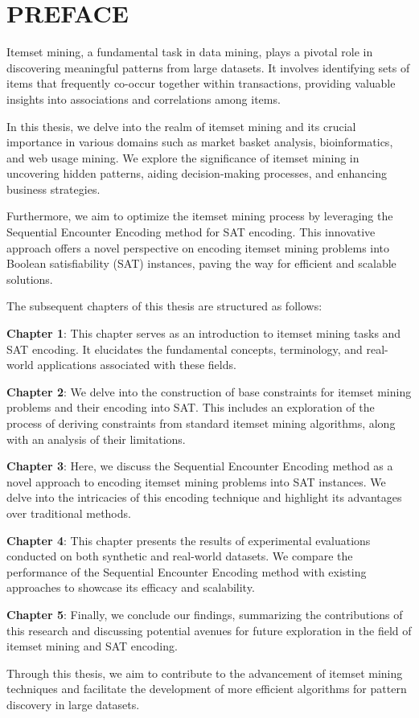 \chapter*{PREFACE}
\fontsize{13}{15}\selectfont

Itemset mining, a fundamental task in data mining, plays a pivotal role in discovering meaningful patterns from large datasets. It involves identifying sets of items that frequently co-occur together within transactions, providing valuable insights into associations and correlations among items.

In this thesis, we delve into the realm of itemset mining and its crucial importance in various domains such as market basket analysis, bioinformatics, and web usage mining. We explore the significance of itemset mining in uncovering hidden patterns, aiding decision-making processes, and enhancing business strategies.

Furthermore, we aim to optimize the itemset mining process by leveraging the Sequential Encounter Encoding method for SAT encoding. This innovative approach offers a novel perspective on encoding itemset mining problems into Boolean satisfiability (SAT) instances, paving the way for efficient and scalable solutions.

The subsequent chapters of this thesis are structured as follows:

\textbf{Chapter 1}: This chapter serves as an introduction to itemset mining tasks and SAT encoding. It elucidates the fundamental concepts, terminology, and real-world applications associated with these fields.

\textbf{Chapter 2}: We delve into the construction of base constraints for itemset mining problems and their encoding into SAT. This includes an exploration of the process of deriving constraints from standard itemset mining algorithms, along with an analysis of their limitations.

\textbf{Chapter 3}: Here, we discuss the Sequential Encounter Encoding method as a novel approach to encoding itemset mining problems into SAT instances. We delve into the intricacies of this encoding technique and highlight its advantages over traditional methods.

\textbf{Chapter 4}: This chapter presents the results of experimental evaluations conducted on both synthetic and real-world datasets. We compare the performance of the Sequential Encounter Encoding method with existing approaches to showcase its efficacy and scalability.

\textbf{Chapter 5}: Finally, we conclude our findings, summarizing the contributions of this research and discussing potential avenues for future exploration in the field of itemset mining and SAT encoding.

Through this thesis, we aim to contribute to the advancement of itemset mining techniques and facilitate the development of more efficient algorithms for pattern discovery in large datasets.
